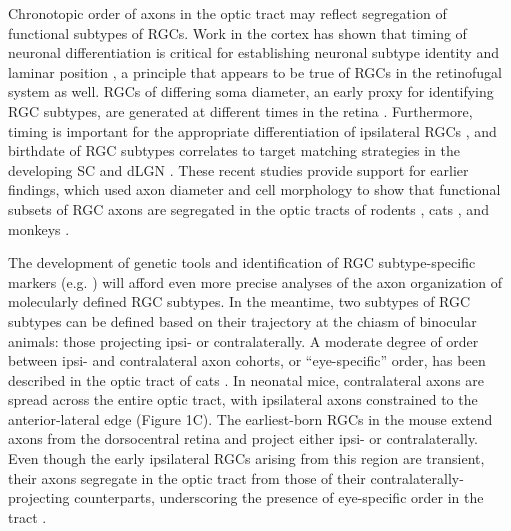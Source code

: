 Chronotopic order of axons in the optic tract may reflect segregation of functional subtypes of RGCs. 
Work in the cortex has shown that timing of neuronal differentiation is critical for establishing neuronal subtype identity and laminar position \cite{molyneaux2007neuronal}, a principle that appears to be true of RGCs in the retinofugal system as well. 
RGCs of differing soma diameter, an early proxy for identifying RGC subtypes, are generated at different times in the retina \cite{rapaport1995spatiotemporal, reese1994birthdates}. 
Furthermore, timing is important for the appropriate differentiation of ipsilateral RGCs \cite{bhansali2014delayed}, and birthdate of RGC subtypes correlates to target matching strategies in the developing SC and dLGN \cite{osterhout2014birthdate}. 
These recent studies provide support for earlier findings, which used axon diameter and cell morphology to show that functional subsets of RGC axons are segregated in the optic tracts of rodents \cite{reese1987distributionrat}, cats \cite{guillery1982arrangement, torrealba1982studies}, and monkeys \cite{reese1990fibre}. 

The development of genetic tools and identification of RGC subtype-specific markers (e.g. \cite{blackshaw2004genomic, dhande2014retinal}) will afford even more precise analyses of the axon organization of molecularly defined RGC subtypes. 
In the meantime, two subtypes of RGC subtypes can be defined based on their trajectory at the chiasm of binocular animals: those projecting ipsi- or contralaterally. 
A moderate degree of order between ipsi- and contralateral axon cohorts, or “eye-specific” order, has been described in the optic tract of cats \cite{torrealba1982studies}. 
In neonatal mice, contralateral axons are spread across the entire optic tract, with ipsilateral axons constrained to the anterior-lateral edge \cite{godement1984prenatal} (Figure 1C). %
The earliest-born RGCs in the mouse extend axons from the dorsocentral retina and project either ipsi- or contralaterally. 
Even though the early ipsilateral RGCs arising from this region are transient, their axons segregate in the optic tract from those of their contralaterally-projecting counterparts, underscoring the presence of eye-specific order in the tract \cite{soares2015transient}. 

